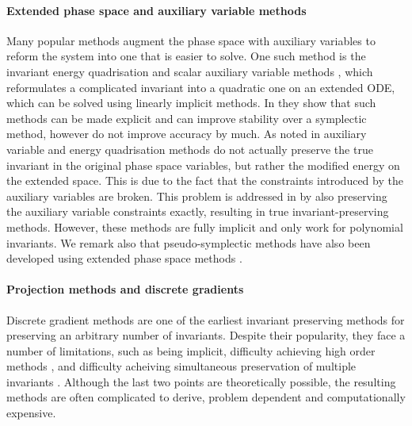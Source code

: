 \documentclass[final,3p,times]{elsarticle}
\begin{document}
\paragraph{Extended phase space and auxiliary variable methods}
Many popular methods augment the phase space with auxiliary variables to reform the system into one that is easier to solve. One such method is the invariant energy quadrisation \cite{zhang2020novel} and scalar auxiliary variable methods \cite{shen2018scalar, bo2022arbitrary}, which reformulates a complicated invariant into a quadratic one on an extended ODE, which can be solved using linearly implicit methods. In \cite{bilbao2023explicit} they show that such methods can be made explicit and can improve stability over a symplectic method, however do not improve accuracy by much. As noted in \cite{zhang2021remark} auxiliary variable and energy quadrisation methods do not actually preserve the true invariant in the original phase space variables, but rather the modified energy on the extended space. This is due to the fact that the constraints introduced by the auxiliary variables are broken. This problem is addressed in \cite{chen2022novel, tapley2022geometric} by also preserving the auxiliary variable constraints exactly, resulting in true invariant-preserving methods. However, these methods are fully implicit and only work for polynomial invariants. We remark also that pseudo-symplectic methods have also been developed using extended phase space methods \cite{tao2016explicit,mclachlan2024runge}.

\paragraph{Projection methods and discrete gradients}
Discrete gradient methods are one of the earliest invariant preserving methods for preserving an arbitrary number of invariants. Despite their popularity, they face a number of limitations, such as being implicit, difficulty achieving high order methods \cite{eidnes2022order}, and difficulty acheiving simultaneous preservation of multiple invariants \cite{mclachlan1999geometric}. Although the last two points are theoretically possible, the resulting methods are often complicated to derive, problem dependent and computationally expensive. 
\end{document}

